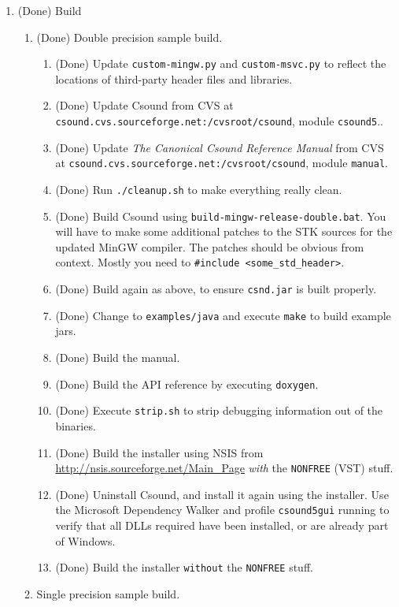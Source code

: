 \documentclass[11pt,letterpaper,onecolumn]{scrartcl}
\begin{document}
\begin{sloppypar}
\begin{enumerate}
\begin{enumerate}
		\end{enumerate}
	\item (Done) Build   
		\begin{enumerate}				
			\item (Done) Double precision sample build.
				\begin{enumerate}
		    	\item (Done) Update \texttt{custom-mingw.py} and \texttt{custom-msvc.py} to reflect the locations of third-party header files and libraries.
					\item (Done) Update Csound from CVS at \verb|csound.cvs.sourceforge.net:/cvsroot/csound|, module \texttt{csound5}..
					\item (Done) Update \emph{The Canonical Csound Reference Manual} from CVS at \verb|csound.cvs.sourceforge.net:/cvsroot/csound|, module \texttt{manual}.
					\item (Done) Run \texttt{./cleanup.sh} to make everything really clean.
			    \item (Done) Build Csound using \texttt{build-mingw-release-double.bat}. You will have to make some additional patches to the STK sources for the updated MinGW compiler. The patches should be obvious from context. Mostly you need to \verb|#include <some_std_header>|.
			    \item (Done) Build again as above, to ensure \texttt{csnd.jar} is built properly.
			    \item (Done) Change to \texttt{examples/java} and execute \texttt{make} to build example jars.
			    \item (Done) Build the manual.
			    \item (Done) Build the API reference by executing \texttt{doxygen}.
			    \item (Done) Execute \texttt{strip.sh} to strip debugging information out of the binaries.
			    \item (Done) Build the installer using NSIS from \url{http://nsis.sourceforge.net/Main_Page} \emph{with} the \verb|NONFREE| (VST) stuff.  
			    \item (Done) Uninstall Csound, and install it again using the installer. Use the Microsoft Dependency Walker and profile \texttt{csound5gui} running to verify that all DLLs required have been installed, or are already part of Windows.
			    \item (Done) Build the installer \texttt{without} the \verb|NONFREE| stuff.   
				\end{enumerate}
			\item Single precision sample build.			

\end{enumerate}
\end{enumerate}
\end{sloppypar}
\end{document}
